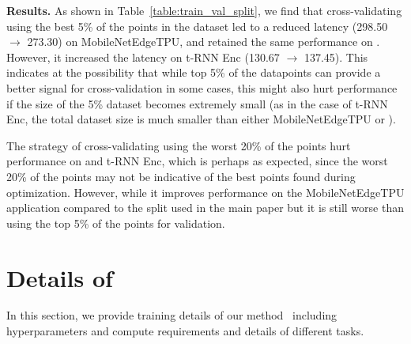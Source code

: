 {\textbf{Results.} As shown in Table~\ref{table:train_val_split}, we find that cross-validating using the best 5\% of the points in the dataset led to a reduced latency (298.50 $\rightarrow$ 273.30) on MobileNetEdgeTPU, and retained the same performance on \msix. However, it increased the latency on t-RNN Enc (130.67 $\rightarrow$ 137.45). This indicates at the possibility that while top 5\% of the datapoints can provide a better signal for cross-validation in some cases, this might also hurt performance if the size of the 5\% dataset becomes extremely small (as in the case of t-RNN Enc, the total dataset size is much smaller than either MobileNetEdgeTPU or \msix).}

{The strategy of cross-validating using the worst 20\% of the points hurt performance on \msix and t-RNN Enc, which is perhaps as expected, since the worst 20\% of the points may not be indicative of the best points found during optimization. However, while it improves performance on the MobileNetEdgeTPU application compared to the split used in the main paper but it is still worse than using the top 5\% of the points for validation.}
%
\begin{table}[H]
\small
\centering
\caption{}
\label{table:train_val_split}
\vspace{-0.1cm}
\end{table}
%


\section{Details of \primemethodname}
\label{app:details}
%
In this section, we provide training details of our method \primemethodname\ including hyperparameters and compute requirements and details of different tasks. 
%
